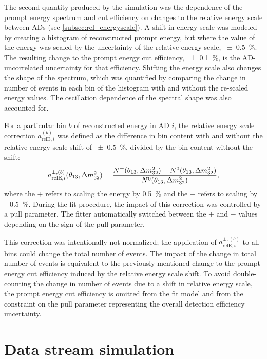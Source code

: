 The second quantity produced by the simulation
was the dependence of the prompt energy spectrum and cut efficiency
on changes to the relative energy scale between ADs (see \cref{subsec:rel_energyscale}).
A shift in energy scale was modeled by
creating a histogram of reconstructed prompt energy,
but where the value of the energy was scaled
by the uncertainty of the relative energy scale, \SI{\pm0.5}{\percent}.
The resulting change to the prompt energy cut efficiency, \SI{\pm0.1}{\percent},
is the AD-uncorrelated uncertainty for that efficiency.
Shifting the energy scale also changes the shape of the spectrum,
which was quantified by comparing the change in number of events
in each bin of the histogram with and without the re-scaled energy values.
The oscillation dependence of the spectral shape was also accounted for.

For a particular bin $b$ of reconstructed energy in AD $i$,
the relative energy scale correction $a_{\text{relE},i}^{(b)}$
was defined as the difference in bin content with and without
the relative energy scale shift of \SI{\pm0.5}{\percent},
divided by the bin content without the shift:
\begin{equation}
    a_{\text{relE},i}^{\pm,(b)}(\thetaot, \Delta m^2_{32}) =
    \frac{N^\pm(\thetaot, \Delta m^2_{32}) - N^0(\thetaot, \Delta m^2_{32})}%
    {N^0(\thetaot, \Delta m^2_{32})},
\end{equation}
where the $+$ refers to scaling the energy by \SI[retain-explicit-plus]{+0.5}{\percent}
and the $-$ refers to scaling by \SI{-0.5}{\percent}.
During the fit procedure, the impact of this correction
was controlled by a pull parameter.
The fitter automatically switched between the $+$ and $-$ values
depending on the sign of the pull parameter.

This correction was intentionally not normalized;
the application of $a_{\text{relE},i}^{\pm,(b)}$ to all bins
could change the total number of events.
The impact of the change in total number of events
is equivalent to the previously-mentioned change
to the prompt energy cut efficiency induced by the relative energy scale shift.
To avoid double-counting the change in number of events
due to a shift in relative energy scale,
the prompt energy cut efficiency is omitted
from the fit model and from the constraint
on the pull parameter representing the overall detection efficiency uncertainty.

\section{Data stream simulation}
\label{sec:toymc}


